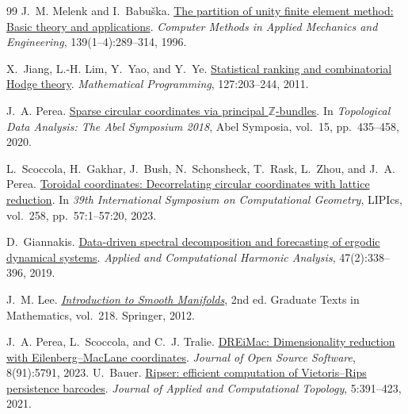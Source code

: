 \documentclass[11pt,a4paper]{article}
\newcommand{\Z}{\mathbb Z}
\begin{document}
\begin{thebibliography}{99}
J.~M. Melenk and I.~Babu\v{s}ka.
\href{https://www.sam.math.ethz.ch/sam_reports/reports_final/reports1996/1996-01.pdf}{The partition of unity finite element method: Basic theory and applications}.
\emph{Computer Methods in Applied Mechanics and Engineering},
139(1--4):289--314, 1996.

X.~Jiang, L.-H. Lim, Y.~Yao, and Y.~Ye.
\href{https://arxiv.org/pdf/0811.1067}{Statistical ranking and combinatorial Hodge theory}.
\emph{Mathematical Programming}, 127:203--244, 2011.

J.~A. Perea.
\href{https://arxiv.org/pdf/1809.09269}{Sparse circular coordinates via principal $\Z$-bundles}.
In \emph{Topological Data Analysis: The Abel Symposium 2018},
Abel Symposia, vol.~15, pp.~435--458, 2020.

L.~Scoccola, H.~Gakhar, J.~Bush, N.~Schonsheck, T.~Rask, L.~Zhou,
and J.~A. Perea.
\href{https://drops.dagstuhl.de/storage/00lipics/lipics-vol258-socg2023/LIPIcs.SoCG.2023.57/LIPIcs.SoCG.2023.57.pdf}{Toroidal coordinates: Decorrelating circular coordinates with lattice reduction}.
In \emph{39th International Symposium on Computational Geometry},
LIPIcs, vol.~258, pp.~57:1--57:20, 2023.

D.~Giannakis.
\href{https://arxiv.org/pdf/1507.02338v4}{Data-driven spectral decomposition and forecasting of ergodic dynamical
systems}.
\emph{Applied and Computational Harmonic Analysis}, 47(2):338--396, 2019.

J.~M. Lee.
\href{https://julianchaidez.net/materials/reu/lee_smooth_manifolds.pdf}{\emph{Introduction to Smooth Manifolds}}, 2nd ed.
Graduate Texts in Mathematics, vol.~218. Springer, 2012.

J.~A. Perea, L.~Scoccola, and C.~J. Tralie.
\href{https://joss.theoj.org/papers/10.21105/joss.05791.pdf}{DREiMac: Dimensionality reduction with Eilenberg--MacLane coordinates}.
\emph{Journal of Open Source Software}, 8(91):5791, 2023.
U.~Bauer.
\href{https://arxiv.org/pdf/1908.02518}{Ripser: efficient computation of Vietoris--Rips persistence barcodes}.
\emph{Journal of Applied and Computational Topology}, 5:391--423, 2021.

\end{thebibliography}
\end{document}
